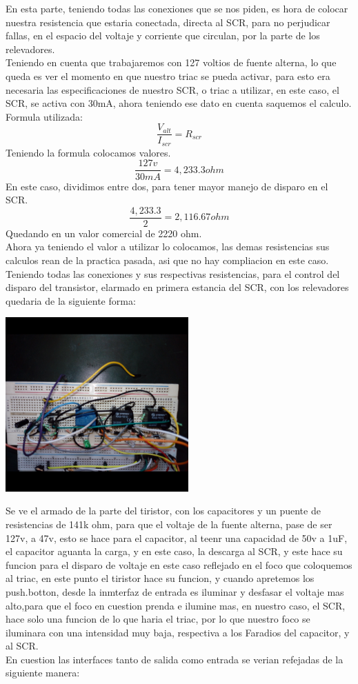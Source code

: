 \documentclass[12pt,a4paper]{article}
\begin{document}
{En esta parte, teniendo todas las conexiones que se nos piden, es hora de colocar nuestra resistencia que estaria conectada, directa al SCR, para no perjudicar fallas, en el espacio del voltaje y corriente que circulan, por la parte de los relevadores.\\
Teniendo en cuenta que trabajaremos con 127 voltios de fuente alterna, lo que queda es ver el momento en que nuestro triac se pueda activar, para esto era necesaria las especificaciones de nuestro SCR, o triac a utilizar, en este caso, el SCR, se activa con 30mA, ahora teniendo ese dato en cuenta saquemos el calculo.
Formula utilizada:
$$ \frac{V_{alt}}{I_{scr}} = R_{scr} $$
Teniendo la formula colocamos valores.
$$ \frac{127v}{30mA} = 4,233.3 ohm $$
En este caso, dividimos entre dos, para tener mayor manejo de disparo en el SCR.
$$ \frac{4,233.3}{2}= 2,116.67 ohm $$
Quedando en un valor comercial de 2220 ohm.\\
Ahora ya teniendo el valor a utilizar lo colocamos, las demas resistencias sus calculos rean de la practica pasada, asi que no hay compliacion en este caso. Teniendo todas las conexiones y sus respectivas resistencias, para el control del disparo del transistor, elarmado en primera estancia del SCR, con los relevadores quedaria de la siguiente forma:\\
\begin{center}
\includegraphics[width=7cm]{Rele.png} 
\end{center}

Se ve el armado de la parte del tiristor, con los capacitores y un puente de resistencias de 141k ohm, para que el voltaje de la fuente alterna, pase de ser 127v, a 47v, esto se hace para el capacitor, al teenr una capacidad de 50v a 1uF, el capacitor aguanta la carga, y en este caso, la descarga al SCR, y este hace su funcion para el disparo de voltaje en este caso reflejado en el foco que coloquemos al triac, en este punto el tiristor hace su funcion, y cuando apretemos los push.botton, desde la inmterfaz de entrada es iluminar y desfasar el voltaje mas alto,para que el foco en cuestion prenda e ilumine mas, en nuestro caso, el SCR, hace solo una funcion de lo que haria el triac, por lo que nuestro foco se iluminara con una intensidad muy baja, respectiva a los Faradios del capacitor, y al SCR.\\
En cuestion las interfaces tanto de salida como entrada se verian refejadas de la siguiente manera:\\

}
\end{document}
